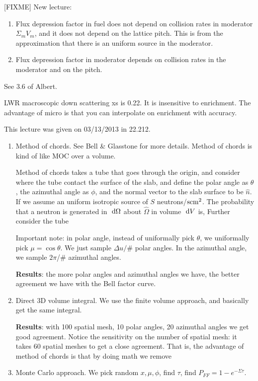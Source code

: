 \documentclass{school-22.211-notes}
\begin{document}
[FIXME] New lecture: 
\begin{enumerate}
\item Flux depression factor in fuel does not depend on collision rates in moderator $\Sigma_m V_m$, and it does not depend on the lattice pitch. This is from the approximation that there is an uniform source in the moderator. 

\item Flux depression factor in moderator depends on collision rates in the moderator and on the pitch. 

\end{enumerate}

See 3.6 of Albert. 

LWR macroscopic down scattering xs is 0.22. It is insensitive to enrichment. The advantage of micro is that you can interpolate on enrichment with accuracy. 

\clearpage
{} %
This lecture was given on 03/13/2013 in 22.212. 

\begin{enumerate}
\item Method of chords. See Bell \& Glasstone for more details. Method of chords is kind of like MOC over a volume. 

Method of chords takes a tube that goes through the origin, and consider where the tube contact the surface of the slab, and define the polar angle as $\theta$, the azimuthal angle as $\phi$, and the normal vector to the slab surface to be $\hat{n}$. If we assume an uniform isotropic source of $S$ neutrons/$\mathrm{s}\mathrm{cm}^2$. The probability that a neutron is generated in $\mbox{ }\mathrm{d} \Omega$ about $\hat{\Omega}$ in volume $\mbox{ }\mathrm{d} V$ is, 
Further consider the tube 




Important note: in polar angle, instead of uniformally pick $\theta$, we uniformally pick $\mu = \cos \theta$. We just sample $\Delta u /$\# polar angles. In the azimuthal angle, we sample $2\pi$/\# azimuthal angles. 


\textbf{Results}: the more polar angles and azimuthal angles we have, the better agreement we have with the Bell factor curve. 


\item Direct 3D volume integral. We use the finite volume approach, and basically get the same integral. 

\textbf{Results}: with 100 spatial mesh, 10 polar angles, 20 azimuthal angles we get good agreement. Notice the sensitivity on the number of spatial mesh: it takes 60 spatial meshes to get a close agreement. That is, the advantage of method of chords is that by doing math we remove 


\item Monte Carlo approach. We pick random $x, \mu, \phi$, find $\tau$, find $P_{FF} = 1 - e^{-\Sigma \tau}$. 
\end{enumerate}
\end{document}
